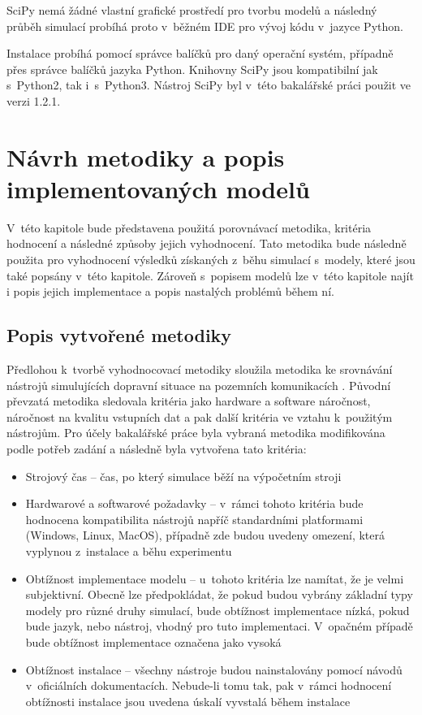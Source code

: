 SciPy nemá žádné vlastní grafické prostředí pro tvorbu modelů a následný průběh simulací probíhá proto v~běžném IDE pro vývoj kódu v~jazyce Python.

Instalace probíhá pomocí správce balíčků pro daný operační systém, případně přes správce balíčků jazyka Python. Knihovny SciPy jsou kompatibilní jak s~Python2, tak i~s~Python3. Nástroj SciPy byl v~této bakalářské práci použit ve verzi 1.2.1.

\chapter{Návrh metodiky a popis implementovaných modelů}
\label{kapitola4}
V~této kapitole bude představena použitá porovnávací metodika, kritéria hodnocení a následné způsoby jejich vyhodnocení. Tato metodika bude následně použita pro vyhodnocení výsledků získaných z~běhu simulací s~modely, které jsou také popsány v~této kapitole. Zároveň s~popisem modelů lze v~této kapitole najít i popis jejich implementace a popis nastalých problémů během ní.

\section{Popis vytvořené metodiky}
\label{metodika}

Předlohou k~tvorbě vyhodnocovací metodiky sloužila metodika ke srovnávání nástrojů simulujících dopravní situace na pozemních komunikacích \cite{jones2004traffic}. Původní převzatá metodika sledovala kritéria jako hardware a software náročnost, náročnost na kvalitu vstupních dat a pak další kritéria ve vztahu k~použitým nástrojům. Pro účely bakalářské práce byla vybraná metodika modifikována podle potřeb zadání a následně byla vytvořena tato kritéria:
\begin{itemize}
    \item Strojový čas -- čas, po který simulace běží na výpočetním stroji
    \item Hardwarové a softwarové požadavky -- v~rámci tohoto kritéria bude hodnocena kompatibilita nástrojů napříč standardními platformami (Windows, Linux, MacOS), případně zde budou uvedeny omezení, která vyplynou z~instalace a běhu experimentu
    \item Obtížnost implementace modelu -- u~tohoto kritéria lze namítat, že je velmi subjektivní. Obecně lze předpokládat, že pokud budou vybrány základní typy modely pro různé druhy simulací, bude obtížnost implementace nízká, pokud bude jazyk, nebo nástroj, vhodný pro tuto implementaci. V~opačném případě bude obtížnost implementace označena jako vysoká
    \item Obtížnost instalace -- všechny nástroje budou nainstalovány pomocí návodů v~oficiálních dokumentacích. Nebude-li tomu tak, pak v~rámci hodnocení obtížnosti instalace jsou uvedena úskalí vyvstalá během instalace
\end{itemize}

